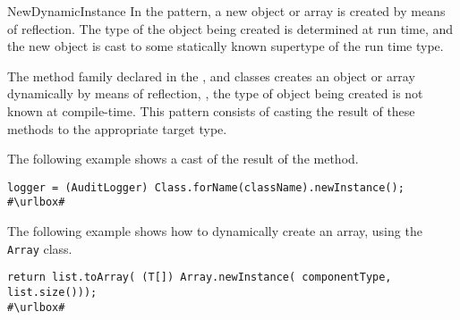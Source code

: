 \begin{pattern}{NewDynamicInstance}
In the \thisp{} pattern, a new 
object or array is created by means of reflection.
The type of the object being created is determined at run time,
and the new object is cast to some statically known supertype of the run time type.

The  method family declared in the ,
and 
classes creates an object or array dynamically by means of reflection, \ie,
the type of object being created is not known at compile-time.
This pattern consists of casting the result of these methods to the appropriate target type.

\instances{}
The following example%
\def\urlvar{http://bit.ly/apache_hadoop_2HC3IPg}
shows a cast of the result of the 
method.

\begin{verbatim}
logger = (AuditLogger) Class.forName(className).newInstance();
#\urlbox#
\end{verbatim}

The following example%
\def\urlvar{http://bit.ly/neo4j_neo4j_2Hp5Hqc}
shows how to dynamically create an array, using the \texttt{Array} class.

\begin{verbatim}
return list.toArray( (T[]) Array.newInstance( componentType, list.size()));
#\urlbox#
\end{verbatim}


\end{pattern}
